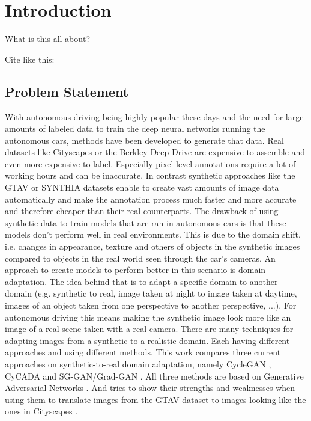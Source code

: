 \chapter{Introduction}
What is this all about?

Cite like this: \cite{NIPS2014_5423}

\section{Problem Statement}
With autonomous driving being highly popular these days and the need for large amounts of labeled data to train the deep neural networks running the autonomous cars, methods have been developed to generate that data. Real datasets like Cityscapes \cite{Cordts_2016_CVPR} or the Berkley Deep Drive \cite{DBLP:journals/corr/abs-1805-04687} are expensive to assemble and even more expensive to label. Especially pixel-level annotations require a lot of working hours and can be inaccurate. In contrast synthetic approaches like the GTAV \cite{Richter_2016_ECCV} or SYNTHIA datasets \cite{RosCVPR16} enable to create vast amounts of image data automatically and make the annotation process much faster and more accurate and therefore cheaper than their real counterparts. The drawback of using synthetic data to train models that are ran in autonomous cars is that these models don't perform well in real environments. This is due to the domain shift, i.e. changes in appearance, texture and others of objects in the synthetic images compared to objects in the real world seen through the car's cameras. An approach to create models to perform better in this scenario is domain adaptation. The idea behind that is to adapt a specific domain to another domain (e.g. synthetic to real, image taken at night to image taken at daytime, images of an object taken from one perspective to another perspective, ...). For autonomous driving this means making the synthetic image look more like an image of a real scene taken with a real camera. There are many techniques for adapting images from a synthetic to a realistic domain. Each having different approaches and using different methods. This work compares three current approaches on synthetic-to-real domain adaptation, namely CycleGAN \cite{DBLP:journals/corr/ZhuPIE17}, CyCADA \cite{DBLP:journals/corr/abs-1711-03213} and SG-GAN/Grad-GAN \cite{DBLP:journals/corr/abs-1801-01726}. All three methods are based on Generative Adversarial Networks \cite{NIPS2014_5423}. And tries to show their strengths and weaknesses when using them to translate images from the GTAV dataset \cite{Richter_2016_ECCV} to images looking like the ones in Cityscapes \cite{Cordts_2016_CVPR}.